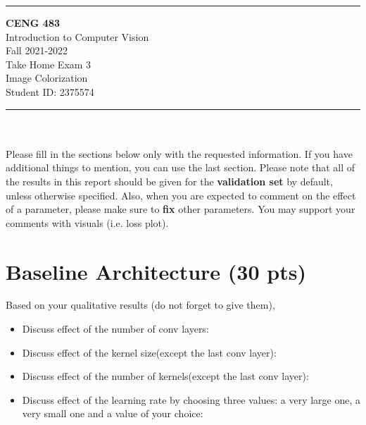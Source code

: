 \documentclass[12pt]{article}
\newcommand{\HRule}{\rule{\linewidth}{1mm}}
\begin{document}
\noindent
\HRule %
\small
\begin{center}
	\LARGE \textbf{CENG 483} \\[4mm]
	\Large Introduction to Computer Vision \\[4mm]
	\normalsize Fall 2021-2022 \\
	\Large Take Home Exam 3 \\
	\Large Image Colorization \\
    \Large Student ID: 2375574 \\
\end{center}
\HRule

\begin{center}
\end{center}
\vspace{-10mm}
\noindent\\ \\ 
Please fill in the sections below only with the requested information. If you have additional things to mention, you can use the last section. Please note that all of the results in this report should be given for the \textbf{validation set} by default, unless otherwise specified. Also, when you are expected to comment on the effect of a parameter, please make sure to \textbf{fix} other parameters. You may support your comments with visuals (i.e. loss plot).

\section{Baseline Architecture (30 pts)}
    Based on your qualitative results (do not forget to give them),
    \begin{itemize}
        \item Discuss effect of the number of conv layers:
        \item Discuss effect of the kernel size(except the last conv layer):
        \item Discuss effect of the number of kernels(except the last conv layer):
        \item Discuss effect of the learning rate by choosing three values: a very large one, a very small one and a value of your choice:

    \end{itemize}
\end{document}

